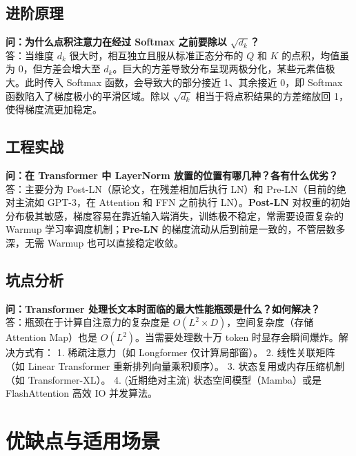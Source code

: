 \documentclass[12pt, a4paper]{article}
\begin{document}
\subsection{进阶原理}
\textbf{问：为什么点积注意力在经过 Softmax 之前要除以 $\sqrt{d_k}$？}\\
答：当维度 $d_k$ 很大时，相互独立且服从标准正态分布的 $Q$ 和 $K$ 的点积，均值虽为 0，但方差会增大至 $d_k$。巨大的方差导致分布呈现两极分化，某些元素值极大。此时传入 Softmax 函数，会导致大的部分接近 1、其余接近 0，即 Softmax 函数陷入了梯度极小的平滑区域。除以 $\sqrt{d_k}$ 相当于将点积结果的方差缩放回 1，使得梯度流更加稳定。

\subsection{工程实战}
\textbf{问：在 Transformer 中 LayerNorm 放置的位置有哪几种？各有什么优劣？}\\
答：主要分为 Post-LN（原论文，在残差相加后执行 LN）和 Pre-LN（目前的绝对主流如 GPT-3，在 Attention 和 FFN 之前执行 LN）。\textbf{Post-LN} 对权重的初始分布极其敏感，梯度容易在靠近输入端消失，训练极不稳定，常需要设置复杂的 Warmup 学习率调度机制；\textbf{Pre-LN} 的梯度流动从后到前是一致的，不管层数多深，无需 Warmup 也可以直接稳定收敛。

\subsection{坑点分析}
\textbf{问：Transformer 处理长文本时面临的最大性能瓶颈是什么？如何解决？}\\
答：瓶颈在于计算自注意力的复杂度是 $O(L^2 \times D)$，空间复杂度（存储 Attention Map）也是 $O(L^2)$。当需要处理数十万 token 时显存会瞬间爆炸。解决方式有：
1. 稀疏注意力（如 Longformer 仅计算局部窗）。
2. 线性关联矩阵（如 Linear Transformer 重新排列向量乘积顺序）。
3. 状态复用或内存压缩机制（如 Transformer-XL）。
4. (近期绝对主流) 状态空间模型（Mamba）或是 FlashAttention 高效 IO 并发算法。

\section{优缺点与适用场景}
\end{document}
